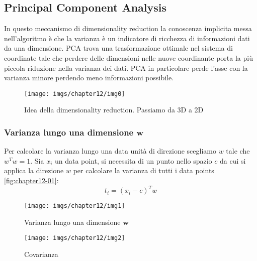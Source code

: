	\subsection{Principal Component Analysis}
	In questo meccanismo di dimensionality reduction la conoscenza implicita messa nell'algoritmo \`e che la varianza \`e un indicatore di ricchezza di informazioni dati da una dimensione.
	PCA trova una trasformazione ottimale nel sistema di coordinate tale che perdere delle dimensioni nelle nuove coordinante porta la pi\`u piccola riduzione nella varianza dei dati.
	PCA in particolare  perde l'asse con la varianza minore perdendo meno informazioni possibile.
	
	\begin{figure}
		\centering
		\texttt{[image: imgs/chapter12/img0]}
		\caption{Idea della dimensionality reduction. Passiamo da 3D a 2D}
		\label{fig:chapter12-00}
	\end{figure}

		\subsubsection{Varianza lungo una dimensione $\mathbf{w}$}
		Per calcolare la varianza lungo una data unit\`a di direzione scegliamo $w$ tale che $w^Tw=1$.
		Sia $x_i$ un data point, si necessita di un punto nello spazio $c$ da cui si applica la direzione $w$ per calcolare la varianza di tutti i data points \ref{fig:chapter12-01}:
		$$t_i = (x_i-c)^Tw$$
		
		
		\begin{figure}
			\centering
			\begin{minipage}{.5\textwidth}
				\centering
				\texttt{[image: imgs/chapter12/img1]}
				\caption{Varianza lungo una dimensione $\mathbf{w}$}
				\label{fig:chapter12-01}
			\end{minipage}%
			\begin{minipage}{.5\textwidth}
				\centering
				\texttt{[image: imgs/chapter12/img2]}
				\caption{Covarianza}
				\label{fig:chapter12-02}
			\end{minipage}
		\end{figure}
		
